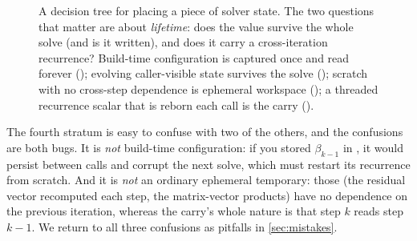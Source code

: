 \begin{figure}[t]
\centering
{}
\caption[Sorting a value into its stratum]{A decision tree for placing a piece of
solver state. The two questions that matter are about \emph{lifetime}: does the
value survive the whole solve (and is it written), and does it carry a
cross-iteration recurrence? Build-time configuration is captured once and read
forever (); evolving caller-visible state survives the solve
(); scratch with no cross-step dependence is ephemeral workspace
(); a threaded recurrence scalar that is reborn each call is the
carry ().}
\label{fig:fourstrata}
\end{figure}

The fourth stratum is easy to confuse with two of the others, and the confusions
are both bugs. It is \emph{not} build-time configuration: if you stored
$\beta_{k-1}$ in , it would persist between calls and corrupt the
next solve, which must restart its recurrence from scratch. And it is \emph{not}
an ordinary ephemeral temporary: those (the residual vector recomputed each step,
the matrix-vector products) have no dependence on the previous iteration, whereas
the carry's whole nature is that step $k$ reads step $k-1$. We return to all
three confusions as pitfalls in \cref{sec:mistakes}.

